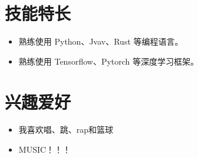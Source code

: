 \documentclass[11pt]{article}
\newlength{\iconwidth}
\begin{document}
    \begin{minipage}[t]{0.6\textwidth}
        \section[技能特长]{\quad 技能特长}
        \begin{itemize}
        \setlength{\itemsep}{0.5em}
            \item 熟练使用 Python、Jvav、Rust 等编程语言。
            \item 熟练使用 Tensorflow、Pytorch 等深度学习框架。
        \end{itemize}
    \end{minipage}
    \hfill
    \begin{minipage}[t]{0.35\textwidth}
        \section[兴趣爱好]{\quad 兴趣爱好}
        \begin{itemize}
        \setlength{\itemsep}{0.5em}
            \item 我喜欢唱、跳、rap和篮球
            \item MUSIC！！！
        \end{itemize}
    \end{minipage}
    
    
\end{document}
